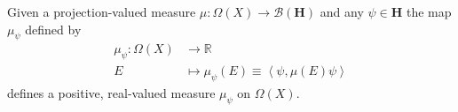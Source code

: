 \begin{theorem}
    \label{thrm:projection-valued-measures-associated-measure}
    \leanok
    Given a projection-valued measure $\mu : \Omega(X) \rightarrow \mathcal{B}(\mathbf{H})$ and any $\psi \in \mathbf{H}$ the map $\mu_\psi$ defined by
    \begin{align}
        \mu_\psi : \Omega(X) &\longrightarrow \mathbb{R} \\
                          E  &\longmapsto \mu_\psi(E) \equiv \left< \psi, \mu(E) \psi \right>
    \end{align}
    defines a positive, real-valued measure $\mu_\psi$ on $\Omega(X)$.
\end{theorem}
